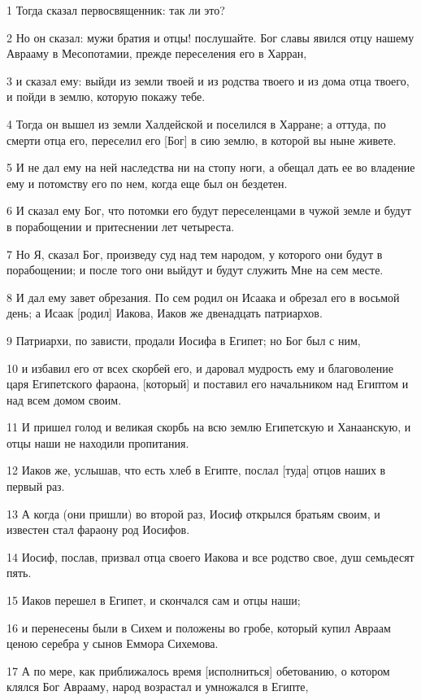 \par 1 Тогда сказал первосвященник: так ли это?
\par 2 Но он сказал: мужи братия и отцы! послушайте. Бог славы явился отцу нашему Аврааму в Месопотамии, прежде переселения его в Харран,
\par 3 и сказал ему: выйди из земли твоей и из родства твоего и из дома отца твоего, и пойди в землю, которую покажу тебе.
\par 4 Тогда он вышел из земли Халдейской и поселился в Харране; а оттуда, по смерти отца его, переселил его [Бог] в сию землю, в которой вы ныне живете.
\par 5 И не дал ему на ней наследства ни на стопу ноги, а обещал дать ее во владение ему и потомству его по нем, когда еще был он бездетен.
\par 6 И сказал ему Бог, что потомки его будут переселенцами в чужой земле и будут в порабощении и притеснении лет четыреста.
\par 7 Но Я, сказал Бог, произведу суд над тем народом, у которого они будут в порабощении; и после того они выйдут и будут служить Мне на сем месте.
\par 8 И дал ему завет обрезания. По сем родил он Исаака и обрезал его в восьмой день; а Исаак [родил] Иакова, Иаков же двенадцать патриархов.
\par 9 Патриархи, по зависти, продали Иосифа в Египет; но Бог был с ним,
\par 10 и избавил его от всех скорбей его, и даровал мудрость ему и благоволение царя Египетского фараона, [который] и поставил его начальником над Египтом и над всем домом своим.
\par 11 И пришел голод и великая скорбь на всю землю Египетскую и Ханаанскую, и отцы наши не находили пропитания.
\par 12 Иаков же, услышав, что есть хлеб в Египте, послал [туда] отцов наших в первый раз.
\par 13 А когда (они пришли) во второй раз, Иосиф открылся братьям своим, и известен стал фараону род Иосифов.
\par 14 Иосиф, послав, призвал отца своего Иакова и все родство свое, душ семьдесят пять.
\par 15 Иаков перешел в Египет, и скончался сам и отцы наши;
\par 16 и перенесены были в Сихем и положены во гробе, который купил Авраам ценою серебра у сынов Еммора Сихемова.
\par 17 А по мере, как приближалось время [исполниться] обетованию, о котором клялся Бог Аврааму, народ возрастал и умножался в Египте,
